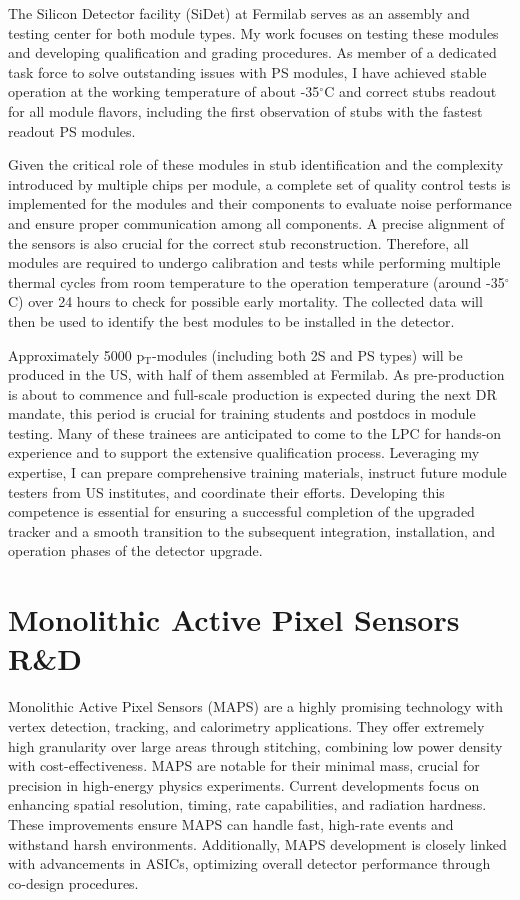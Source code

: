 {\begin{flushleft}
The Silicon Detector facility (SiDet) at Fermilab serves as an assembly and testing center for both module types. My work focuses on testing these modules and developing qualification and grading procedures. As member of a dedicated task force to solve outstanding issues with PS modules, I have achieved stable operation at the working temperature of about -35$^{\circ}$C and correct stubs readout for all module flavors, including the first observation of stubs with the fastest readout PS modules.

Given the critical role of these modules in stub identification and the complexity introduced by multiple chips per module, a complete set of quality control tests is implemented for the modules and their components to evaluate noise performance and ensure proper communication among all components. A precise alignment of the sensors is also crucial for the correct stub reconstruction. Therefore, all modules are required to undergo calibration and tests while performing multiple thermal cycles from room temperature to the operation temperature (around -35$^{\circ}$C) over 24 hours to check for possible early mortality. The collected data will then be used to identify the best modules to be installed in the detector.
 
Approximately 5000 p$_{\mathrm{T}}$-modules (including both 2S and PS types) will be produced in the US, with half of them assembled at Fermilab. As pre-production is about to commence and full-scale production is expected during the next DR mandate, this period is crucial for training students and postdocs in module testing. Many of these trainees are anticipated to come to the LPC for hands-on experience and to support the extensive qualification process.
Leveraging my expertise, I can prepare comprehensive training materials, instruct future module testers from US institutes, and coordinate their efforts. Developing this competence is essential for ensuring a successful completion of the upgraded tracker and a smooth transition to the subsequent integration, installation, and operation phases of the detector upgrade.

\section{Monolithic Active Pixel Sensors R\&D}
\vspace{\baselineskip}
Monolithic Active Pixel Sensors (MAPS) are a highly promising technology with vertex detection, tracking, and calorimetry applications. They offer extremely high granularity over large areas through stitching, combining low power density with cost-effectiveness. MAPS are notable for their minimal mass, crucial for precision in high-energy physics experiments.
Current developments focus on enhancing spatial resolution, timing, rate capabilities, and radiation hardness. These improvements ensure MAPS can handle fast, high-rate events and withstand harsh environments. Additionally, MAPS development is closely linked with advancements in ASICs, optimizing overall detector performance through co-design procedures.


\end{flushleft}}
